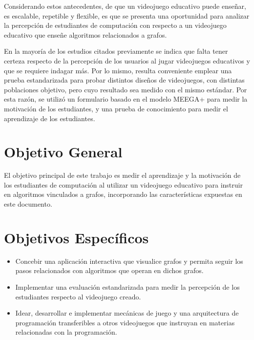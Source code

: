 Considerando estos antecedentes, de que un videojuego educativo puede enseñar, es escalable, repetible y flexible, es que se presenta una oportunidad para analizar la percepción de estudiantes de computación con respecto a un videojuego educativo que enseñe algoritmos relacionados a grafos.

En la mayoría de los estudios citados previamente se indica que falta tener certeza respecto de la percepción de los usuarios al jugar videojuegos educativos y que se requiere indagar más. Por lo mismo, resulta conveniente emplear una prueba estandarizada para probar distintos diseños de videojuegos, con distintas poblaciones objetivo, pero cuyo resultado sea medido con el mismo estándar. Por esta razón, se utilizó un formulario basado en el modelo MEEGA+ \cite{meegaplus} para medir la motivación de los estudiantes, y una prueba de conocimiento para medir el aprendizaje de los estudiantes.




\section{Objetivo General}

El objetivo principal de este trabajo es medir el aprendizaje y la motivación de los estudiantes de computación al utilizar un videojuego educativo para instruir en algoritmos vinculados a grafos, incorporando las características expuestas en este documento.

\section{Objetivos Específicos}

\begin{itemize}

\item Concebir una aplicación interactiva que visualice grafos y permita seguir los pasos relacionados con algoritmos que operan en dichos grafos.

\item Implementar una evaluación estandarizada para medir la percepción de los estudiantes respecto al videojuego creado.

\item Idear, desarrollar e implementar mecánicas de juego y una arquitectura de programación transferibles a otros videojuegos que instruyan en materias relacionadas con la programación.


\end{itemize}



